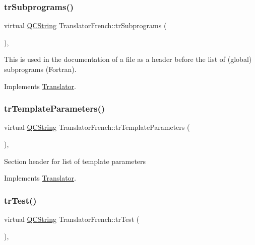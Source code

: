 \subsubsection{\texorpdfstring{trSubprograms()}{trSubprograms()}}
{\footnotesize\ttfamily virtual \mbox{\hyperlink{class_q_c_string}{Q\+C\+String}} Translator\+French\+::tr\+Subprograms (\begin{DoxyParamCaption}{ }\end{DoxyParamCaption})\hspace{0.3cm}{\ttfamily [inline]}, {\ttfamily [virtual]}}

This is used in the documentation of a file as a header before the list of (global) subprograms (Fortran). 

Implements \mbox{\hyperlink{class_translator}{Translator}}.

\mbox{\label{class_translator_french_a58808d5b7b5e2b26356fa8a415ec0c64}} 
\subsubsection{\texorpdfstring{trTemplateParameters()}{trTemplateParameters()}}
{\footnotesize\ttfamily virtual \mbox{\hyperlink{class_q_c_string}{Q\+C\+String}} Translator\+French\+::tr\+Template\+Parameters (\begin{DoxyParamCaption}{ }\end{DoxyParamCaption})\hspace{0.3cm}{\ttfamily [inline]}, {\ttfamily [virtual]}}

Section header for list of template parameters 

Implements \mbox{\hyperlink{class_translator}{Translator}}.

\mbox{\label{class_translator_french_a2a59264db8d1b2261fbb5234ce6e827b}} 
\subsubsection{\texorpdfstring{trTest()}{trTest()}}
{\footnotesize\ttfamily virtual \mbox{\hyperlink{class_q_c_string}{Q\+C\+String}} Translator\+French\+::tr\+Test (\begin{DoxyParamCaption}{ }\end{DoxyParamCaption})\hspace{0.3cm}{\ttfamily [inline]}, {\ttfamily [virtual]}}

